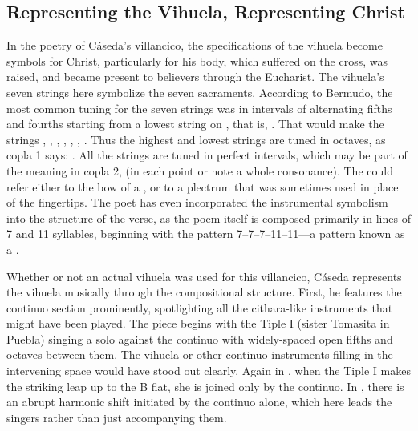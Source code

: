 \subsection{Representing the Vihuela, Representing Christ}

In the poetry of Cáseda's villancico, the specifications of the vihuela become
symbols for Christ, particularly for his body, which suffered on the cross, was
raised, and became present to believers through the Eucharist.
The vihuela's seven strings here symbolize the seven sacraments.
According to Bermudo, the most common tuning for the seven strings was in
intervals of alternating fifths and fourths starting from a lowest string on 
, that is, .%
    \Autocite[109r--109v]{Bermudo:Declaracion}
That would make the strings , , ,
, , , .
Thus the highest and lowest strings are tuned in octaves, as copla 1 says:
.
All the strings are tuned in perfect intervals, which may be part of the
meaning in copla 2,  (in each point or
note a whole consonance).
The  could refer either to the bow of a , or
to a plectrum that was sometimes used in place of the fingertips.
The poet has even incorporated the instrumental symbolism into the structure of
the verse, as the poem itself is composed primarily in lines of 7 and 11
syllables, beginning with the pattern 7--7--7--11--11---a pattern known as a
.%
    \Autocite{Lauer:Metrification}


Whether or not an actual vihuela was used for this villancico, Cáseda
represents the vihuela musically through the compositional structure.
First, he features the continuo section prominently, spotlighting all the
cithara-like instruments that might have been played.
The piece begins with the Tiple I (sister Tomasita in Puebla) singing a solo
against the continuo with widely-spaced open fifths and octaves between them.
The vihuela or other continuo instruments filling in the intervening space
would have stood out clearly.
Again in , when the Tiple I makes the striking leap up to the
B flat, she is joined only by the continuo.
In , there is an abrupt harmonic shift initiated by the continuo
alone, which here leads the singers rather than just accompanying them.



